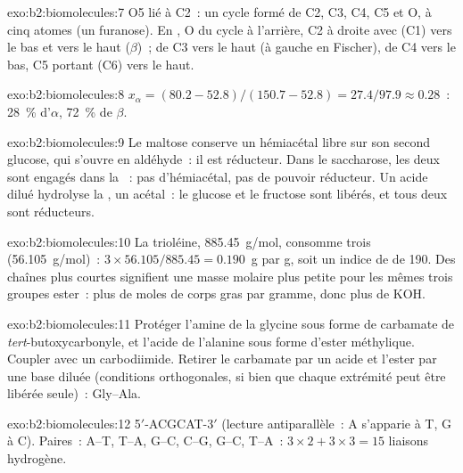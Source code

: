 \begin{solution}{exo:b2:biomolecules:7}
O5 lié à C2~: un cycle formé de C2, C3, C4, C5 et O, à cinq atomes (un furanose). En , O du cycle à l'arrière, C2 à droite avec  (C1) vers le bas et  vers le haut
($\beta$)~;  de C3 vers le haut (à gauche
en Fischer),  de C4 vers le bas, C5 portant  (C6) vers le haut.
\end{solution}

\begin{solution}{exo:b2:biomolecules:8}
$x_\alpha = (80.2 - 52.8)/(150.7 - 52.8) = 27.4/97.9 \approx 0.28$~: 28~\% d'$\alpha$, 72~\% de $\beta$.
\end{solution}

\begin{solution}{exo:b2:biomolecules:9}
Le maltose conserve un hémiacétal libre sur son second glucose, qui s'ouvre en aldéhyde~: il est
réducteur. Dans le saccharose, les deux  sont engagés dans la ~:
pas d'hémiacétal, pas de pouvoir réducteur. Un acide dilué hydrolyse la , un
acétal~: le glucose et le fructose sont libérés, et tous deux sont réducteurs.
\end{solution}

\begin{solution}{exo:b2:biomolecules:10}
La trioléine, \qty{885.45}{g/mol}, consomme trois  (\qty{56.105}{g/mol})~: $3 \times 56.105/885.45 =
0.190$~g par g, soit un indice de  de 190. Des chaînes plus courtes signifient une masse
molaire plus petite pour les mêmes trois groupes ester~: plus de moles de corps gras par gramme, donc
plus de KOH.
\end{solution}

\begin{solution}{exo:b2:biomolecules:11}
Protéger l'amine de la glycine sous forme de carbamate de \textit{tert}-butoxycarbonyle, et l'acide de
l'alanine sous forme d'ester méthylique. Coupler avec un carbodiimide. Retirer le carbamate par un acide
et l'ester par une base diluée (conditions orthogonales, si bien que chaque extrémité peut être libérée
seule)~: Gly--Ala.
\end{solution}

\begin{solution}{exo:b2:biomolecules:12}
5$'$-ACGCAT-3$'$ (lecture antiparallèle~: A s'apparie à T, G à C). Paires~: A--T, T--A, G--C, C--G, G--C, T--A~:
$3 \times 2 + 3 \times 3 = 15$ liaisons hydrogène.
\end{solution}

